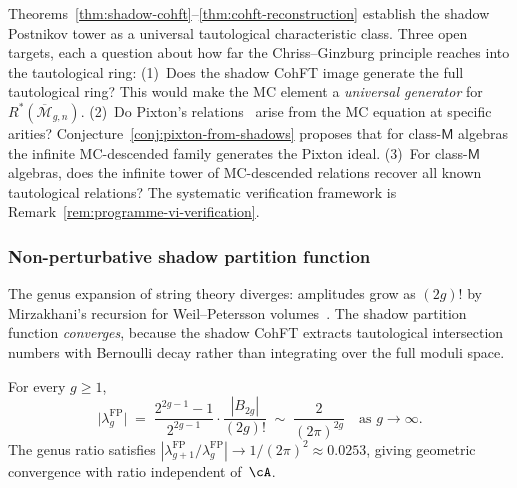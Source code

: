 \begin{remark}
\label{rem:dream-theorem-scope}
Theorems~\ref{thm:shadow-cohft}--\ref{thm:cohft-reconstruction}
establish the shadow Postnikov tower
as a universal tautological characteristic class.
Three open targets, each a question about how far the Chriss--Ginzburg
principle reaches into the tautological ring:
\textup{(1)}~Does the shadow CohFT image generate the full tautological
ring?  This would make the MC element a \emph{universal generator} for
$R^*(\overline{\mathcal{M}}_{g,n})$.
\textup{(2)}~Do Pixton's relations~\textup{\cite{Janda17,PPZ19}}
arise from the MC equation at specific arities?
Conjecture~\textup{\ref{conj:pixton-from-shadows}} proposes that for
class-$\mathsf{M}$ algebras the infinite MC-descended family generates
the Pixton ideal.
\textup{(3)}~For class-$\mathsf{M}$ algebras, does the
infinite tower of MC-descended relations
recover all known tautological relations?  The systematic verification
framework is Remark~\textup{\ref{rem:programme-vi-verification}}.
\end{remark}


\subsubsection{Non-perturbative shadow partition function}
\label{subsubsec:shadow-double-convergence}

The genus expansion of string theory diverges: amplitudes grow as
$(2g)!$ by Mirzakhani's recursion for Weil--Petersson
volumes~\cite{Mirzakhani}.
The shadow partition function \emph{converges}, because the shadow CohFT
extracts tautological intersection numbers with Bernoulli decay rather
than integrating over the full moduli space.

\begin{proposition}
\label{prop:fp-genus-decay-for-double}
For every $g \geq 1$,
\begin{equation}\label{eq:fp-genus-decay}
\bigl|\lambda_g^{\mathrm{FP}}\bigr|
\;=\;
\frac{2^{2g-1}-1}{2^{2g-1}}
\cdot
\frac{|B_{2g}|}{(2g)!}
\;\sim\;
\frac{2}{(2\pi)^{2g}}
\quad\text{as } g \to \infty.
\end{equation}
The genus ratio satisfies
$|\lambda_{g+1}^{\mathrm{FP}}/\lambda_g^{\mathrm{FP}}|
\to 1/(2\pi)^2 \approx 0.0253$, giving geometric convergence
with ratio independent of~$\cA$.
\end{proposition}

